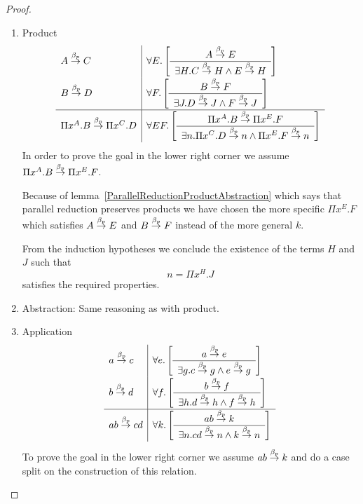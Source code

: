 \begin{theorem}
\begin{proof}
\begin{enumerate}
        \item Product
        $$
        \begin{array}{l|l}
            A \stackrel{\beta_p}{\to} C
            &
            \forall E.
            \left[
            \begin{array}{c} A \stackrel{\beta_p}{\to} E \\ \hline \exists H. C \stackrel{\beta_p}{\to} H \land E \stackrel{\beta_p}{\to} H\end{array}
            \right]
            \\
            B \stackrel{\beta_p}{\to} D
            &
            \forall F.
            \left[
            \begin{array}{c} B \stackrel{\beta_p}{\to} F \\ \hline \exists J. D \stackrel{\beta_p}{\to} J \land F \stackrel{\beta_p}{\to} J\end{array}
            \right]
            \\
            \hline
            \Pi x^A. B \stackrel{\beta_p}{\to} \Pi x^C. D
            &
            \forall E F.
            \left[
            \begin{array}{c} 
                \Pi x^A.B \stackrel{\beta_p}{\to} \Pi x^E. F
             \\ \hline 
                \exists n.
                \Pi x^C. D \stackrel{\beta_p}{\to} n
                \land
                \Pi x^E. F \stackrel{\beta_p}{\to} n
            \end{array}
            \right]
        \end{array}
        $$
        In order to prove the goal in the lower right corner we assume $\Pi x^A.
        B \stackrel{\beta_p}{\to} \Pi x^E.F$.

        Because of lemma~\ref{ParallelReductionProductAbstraction} which says
        that parallel reduction preserves products we have chosen the more
        specific $\Pi x^E.F$ which satisfies $A \stackrel{\beta_p}{\to} E$ and $B \stackrel{\beta_p}{\to} F$
        instead of the more general $k$.

        From the induction hypotheses we conclude the existence of the terms $H$
        and $J$ such that
        $$
            n = \Pi x^H. J
        $$
        satisfies the required properties.

        \item Abstraction: Same reasoning as with product.

        \item Application
        $$
        \begin{array}{l|l}
            a \stackrel{\beta_p}{\to} c
            &
            \forall e.
            \left[
            \begin{array}{c} 
                a \stackrel{\beta_p}{\to} e
             \\ \hline 
                \exists g. c \stackrel{\beta_p}{\to} g \land e \stackrel{\beta_p}{\to} g
            \end{array}
            \right]
            \\
            b \stackrel{\beta_p}{\to} d
            &
            \forall f.
            \left[
            \begin{array}{c} 
                b \stackrel{\beta_p}{\to} f
             \\ \hline 
                \exists h. d \stackrel{\beta_p}{\to} h \land f \stackrel{\beta_p}{\to} h
            \end{array}
            \right]
            \\
            \hline
            a b \stackrel{\beta_p}{\to} c d
            &
            \forall k.
            \left[
            \begin{array}{c} 
                a b \stackrel{\beta_p}{\to} k
             \\ \hline 
                \exists n. c d \stackrel{\beta_p}{\to} n \land k \stackrel{\beta_p}{\to} n
            \end{array}
            \right]
        \end{array}
        $$
        To prove the goal in the lower right corner we assume $a b \stackrel{\beta_p}{\to} k$
        and do a case split on the construction of this relation.


\end{enumerate}
\end{proof}
\end{theorem}
